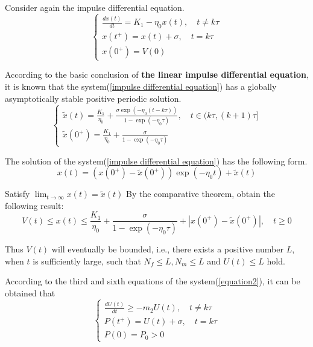 \documentclass{mcmthesis}
\begin{document}
Consider again the impulse differential equation.
\begin{equation}
  \label{impulse differential equation}
  \left\{\begin{array}{l}
    \frac{d x(t)}{d t}=K_{1}-\eta_{0} x(t), \quad t \neq k \tau \\
    x\left(t^{+}\right)=x(t)+\sigma, \quad t=k \tau             \\
    x\left(0^{+}\right)=V(0)
  \end{array}\right.
\end{equation}

According to the basic conclusion of \textbf{the linear impulse differential equation},
it is known that the system(\ref{impulse differential equation}) has a globally asymptotically stable positive periodic solution.
\begin{equation}
  \left\{\begin{array}{l}
    \tilde{x}(t)=\frac{K_{1}}{\eta_{0}}+\frac{\sigma \exp \left(-\eta_{0}(t-k \tau)\right)}{1-\exp \left(-\eta_{0} \tau\right)}, \quad t \in(k \tau,(k+1) \tau]  \\
    \tilde{x}\left(0^{+}\right)=\frac{K_{1}}{\eta_{0}}+\frac{\sigma}{1-\exp \left(-\eta_{0} \tau\right)}
  \end{array}\right.
\end{equation}

The solution of the system(\ref{impulse differential equation}) has the following form.
\begin{equation}
  x(t)=\left(x\left(0^{+}\right)-\tilde{x}\left(0^{+}\right)\right) \exp \left(-\eta_{0} t\right)+\tilde{x}(t)
\end{equation}

Satisfy $\lim _{t \rightarrow \infty} x(t)=\tilde{x}(t)$
By the comparative theorem, obtain the following result:
\begin{equation}
  V(t) \leq x(t) \leq \frac{K_{1}}{\eta_{0}}+\frac{\sigma}{1-\exp \left(-\eta_{0} \tau\right)}+\left|x\left(0^{+}\right)-\tilde{x}\left(0^{+}\right)\right|, \quad t \geq 0
\end{equation}

Thus $V(t)$ will eventually be bounded, i.e., there exists a positive number $L$,
when $t$ is sufficiently large, such that $N_{f} \leq L, N_{m} \leq L$ and $U(t) \leq L$ hold.

According to the third and sixth equations of the system(\ref{equation2}), it can be obtained that
\begin{equation}
  \left\{
  \begin{array}{l}
    \frac{d U(t)}{d t} \geq-m_{2} U(t), \quad t \neq k \tau  \\
    P\left(t^{+}\right)=U(t)+\sigma, \quad t=k \tau          \\
    P(0)=P_{0}>0 
  \end{array}\right.
\end{equation}
\end{document}
